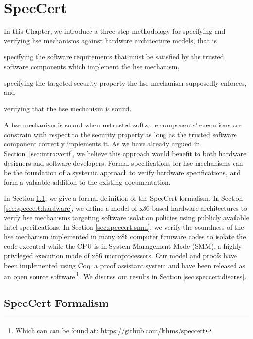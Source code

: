 \chapter{SpecCert}
\label{chapter:speccert}

In this Chapter, we introduce a three-step methodology for specifying and
verifying \ac{hse} mechanisms against hardware architecture models, that is
%
\begin{inparaenum}[(1)]
\item specifying the software requirements that must be satisfied by the trusted
software components which implement the \ac{hse} mechanism,
%
\item specifying the targeted security property the \ac{hse} mechanism supposedly
  enforces, and
%
\item verifying that the \ac{hse} mechanism is sound.
\end{inparaenum}
%
A \ac{hse} mechanism is sound when untrusted software components' executions are
constrain with respect to the security property as long as the trusted software
component correctly implements it.
%
As we have already argued in Section~\ref{sec:intro:verif}, we believe this
approach would benefit to both hardware designers and software developers.
%
Formal specifications for \ac{hse} mechanisms can be the foundation of a
systemic approach to verify hardware specifications, and form a valuable
addition to the existing documentation.

In Section \ref{sec:speccert:framework}, we give a formal definition of the
SpecCert formalism.
%
In Section \ref{sec:speccert:hardware}, we define a model of x86-based hardware
architectures to verify \ac{hse} mechanisms targeting software isolation policies
using publicly available Intel specifications.
%
In Section \ref{sec:speccert:smm}, we verify the soundness of the \ac{hse} mechanism
implemented in many x86 computer firmware codes to isolate the code executed
while the CPU is in System Management Mode (SMM), a highly privileged execution
mode of x86 microprocessors.
%
Our model and proofs have been implemented using Coq, a proof assistant system
and have been released as an open source software\,\footnote{Which can can be
  found at: \url{https://github.com/lthms/speccert}}.
%
We discuss our results in Section \ref{sec:speccert:discuss}.

\section{SpecCert Formalism} \label{sec:speccert:framework}

